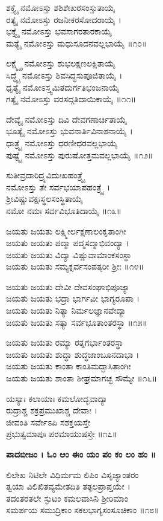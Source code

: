 ಶಕ್ತ್ಯೈ ನಮೋಽಸ್ತು ಶಶಿಶೇಖರಸಂಸ್ತುತಾಯೈ\\ ರತ್ಯೈ ನಮೋಽಸ್ತು ರಜನೀಕರಸೋದರಾಯೈ ।\\
ಭಕ್ತ್ಯೈ ನಮೋಽಸ್ತು ಭವಸಾಗರತಾರಕಾಯೈ \\ಮತ್ಯೈ ನಮೋಽಸ್ತು ಮಧುಸೂದನವಲ್ಲಭಾಯೈ ॥೧೦॥

	ಲಕ್ಷ್ಮ್ಯೈ ನಮೋಽಸ್ತು ಶುಭಲಕ್ಷಣಲಕ್ಷಿತಾಯೈ \\ಸಿದ್ಧ್ಯೈ ನಮೋಽಸ್ತು ಶಿವಸಿದ್ಧಸುಪೂಜಿತಾಯೈ ।\\
	ಧೃತ್ಯೈ ನಮೋಽಸ್ತ್ವಮಿತದುರ್ಗತಿಭಂಜನಾಯೈ \\ಗತ್ಯೈ ನಮೋಽಸ್ತು ವರಸದ್ಗತಿದಾಯಿಕಾಯೈ ॥೧೧॥

ದೇವ್ಯೈ ನಮೋಽಸ್ತು ದಿವಿ ದೇವಗಣಾರ್ಚಿತಾಯೈ \\ಭೂತ್ಯೈ ನಮೋಽಸ್ತು ಭುವನಾರ್ತಿವಿನಾಶನಾಯೈ ।\\
ಧಾತ್ರ್ಯೈ ನಮೋಽಸ್ತು ಧರಣೀಧರವಲ್ಲಭಾಯೈ \\ಪುಷ್ಟ್ಯೈ ನಮೋಽಸ್ತು ಪುರುಷೋತ್ತಮವಲ್ಲಭಾಯೈ ॥೧೨॥

	ಸುತೀವ್ರದಾರಿದ್ರ್ಯವಿದುಃಖಹಂತ್ರ್ಯೈ \\ನಮೋಽಸ್ತು ತೇ ಸರ್ವಭಯಾಪಹಂತ್ರ್ಯೈ ।\\
	ಶ್ರೀವಿಷ್ಣುವಕ್ಷಃಸ್ಥಲಸಂಸ್ಥಿತಾಯೈ \\ನಮೋ ನಮಃ ಸರ್ವವಿಭೂತಿದಾಯೈ ॥೧೩॥

ಜಯತು ಜಯತು ಲಕ್ಷ್ಮೀರ್ಲಕ್ಷಣಾಲಂಕೃತಾಂಗೀ\\ ಜಯತು ಜಯತು ಪದ್ಮಾ ಪದ್ಮಸದ್ಮಾಭಿವಂದ್ಯಾ ।\\
ಜಯತು ಜಯತು ವಿದ್ಯಾ ವಿಷ್ಣುವಾಮಾಂಕಸಂಸ್ಥಾ \\ಜಯತು ಜಯತು ಸಮ್ಯಕ್ಸರ್ವಸಂಪತ್ಕರೀ ಶ್ರೀಃ ॥೧೪॥

ಜಯತು ಜಯತು ದೇವೀ ದೇವಸಂಘಾಭಿಪೂಜ್ಯಾ \\ಜಯತು ಜಯತು ಭದ್ರಾ ಭಾರ್ಗವೀ ಭಾಗ್ಯರೂಪಾ ।\\
ಜಯತು ಜಯತು ನಿತ್ಯಾ ನಿರ್ಮಲಜ್ಞಾನವೇದ್ಯಾ \\ಜಯತು ಜಯತು ಸತ್ಯಾ ಸರ್ವಭೂತಾಂತರಸ್ಥಾ ॥೧೫॥

	ಜಯತು ಜಯತು ರಮ್ಯಾ ರತ್ನಗರ್ಭಾಂತರಸ್ಥಾ \\ಜಯತು ಜಯತು ಶುದ್ಧಾ ಶುದ್ಧಜಾಂಬೂನದಾಭಾ ।\\
	ಜಯತು ಜಯತು ಕಾಂತಾ ಕಾಂತಿಮದ್ಭಾಸಿತಾಂಗೀ \\ಜಯತು ಜಯತು ಶಾಂತಾ ಶೀಘ್ರಮಾಗಚ್ಛ ಸೌಮ್ಯೇ ॥೧೬॥

ಯಸ್ಯಾಃ ಕಲಾಯಾಃ ಕಮಲೋದ್ಭವಾದ್ಯಾ\\ ರುದ್ರಾಶ್ಚ ಶಕ್ರಪ್ರಮುಖಾಶ್ಚ ದೇವಾಃ ।\\
ಜೀವಂತಿ ಸರ್ವೇಽಪಿ ಸಶಕ್ತಯಸ್ತೇ \\ಪ್ರಭುತ್ವಮಾಪುಃ ಪರಮಾಯುಷಸ್ತೇ ॥೧೭॥

{\bfseries ಪಾದಬೀಜಂ । ಓಂ ಆಂ ಈಂ ಯಂ ಪಂ ಕಂ ಲಂ ಹಂ ॥}

ಲಿಲೇಖ ನಿಟಿಲೇ ವಿಧಿರ್ಮಮ ಲಿಪಿಂ ವಿಸೃಜ್ಯಾಂತರಂ\\
ತ್ವಯಾ ವಿಲಿಖಿತವ್ಯಮೇತದಿತಿ ತತ್ಫಲಪ್ರಾಪ್ತಯೇ ।\\
	ತದಂತರತಲೇ ಸ್ಫುಟಂ ಕಮಲವಾಸಿನಿ ಶ್ರೀರಿಮಾಂ\\
	ಸಮರ್ಪಯ ಸಮುದ್ರಿಕಾಂ ಸಕಲಭಾಗ್ಯಸಂಸೂಚಿಕಾಂ ॥೧೮॥

